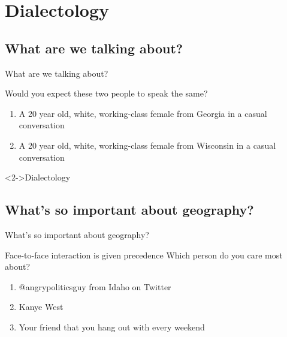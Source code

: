 \documentclass{beamer}
\subtitle[Dialectology]{Dialectology}
\newcommand{\suboneone}{What are we talking about?}
\newcommand{\subonetwo}{What's so important about geography?}
\begin{document}
  

  \section{Dialectology}
    \subsection{\suboneone}
      \begin{frame}{\suboneone}
        \begin{block}{Would you expect these two people to speak the same?}
          \begin{enumerate}
            \item A 20 year old, white, working-class female from \alert<2->{Georgia} in a casual conversation
            \item A 20 year old, white, working-class female from \alert<2->{Wisconsin} in a casual conversation
          \end{enumerate}
        \end{block}
        \begin{alertblock}<2->{Dialectology}
          
        \end{alertblock}
      \end{frame}

    \subsection{\subonetwo}
      \begin{frame}{\subonetwo}
        \begin{block}{Face-to-face interaction is given precedence}
          Which person do you care most about?
          \begin{enumerate}
            \item @angrypoliticsguy from Idaho on Twitter
            \item Kanye West
            \item Your friend that you hang out with every weekend
          \end{enumerate}
        \end{block}
      \end{frame}
\end{document}
